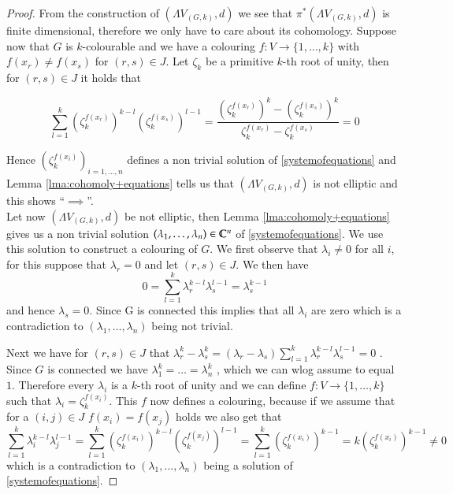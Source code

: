  \begin{proof}
  From the construction of $(\Lambda V_{(G,k)},d)$ we see that  $\pi^*(\Lambda V_{(G,k)},d)$ is finite dimensional, therefore
  we only have to care about its cohomology. Suppose now that $G$ is $k$-colourable and we have a colouring
  $f \colon V \to { \lbrace 1, \dotsc , k \rbrace }$ with $f(x_r) \neq f(x_s)$ for $(r,s) \in J$. Let $\zeta_k$ be a primitive 
  $k$-th root of unity, then for $(r,s) \in J$ it holds that
  
  $$ \sum_{l = 1}^k (\zeta_k^{f(x_r)})^{k-l} (\zeta_k^{f(x_s)})^{l-1}
  = \frac{(\zeta_k^{f(x_r)})^{k} - (\zeta_k^{f(x_s)})^{k}}{ \zeta_k^{f(x_r)} - \zeta_k^{f(x_s)}} = 0
  $$
  
  Hence $(\zeta_k^{f(x_i)})_{i = 1, \dotsc, n}$ defines a non trivial solution of \ref{systemofequations}
  and Lemma \ref{lma:cohomoly+equations} tells us that $(\Lambda V_{(G,k)},d)$ is not elliptic and this shows
  ``$\implies$''. \\
  Let now $(\Lambda V_{(G,k)},d)$ be not elliptic, then Lemma \ref{lma:cohomoly+equations} gives us a non trivial
  solution $(\lambda_1 , \dotsc, \lambda_n) \in \mathbb{C}^n$ of \ref{systemofequations}. We use this solution to construct
  a colouring of $G$. 
  We first observe that $\lambda_i \neq 0$ for all $i$, for this suppose that $\lambda_r = 0$ and let $(r,s) \in J$.
  We then have 
  $$0 =\sum_{l = 1}^k \lambda_r^{k -l} \lambda_s^{l - 1} = \lambda_s^{k-1}$$
  and hence $\lambda_s = 0$. Since G is connected this implies that all $\lambda_i$ are zero which is a
  contradiction to $(\lambda_1, \ldots, \lambda_n)$ being not trivial.
  
  Next we have
  for $(r,s) \in J$ that $ \lambda_r^k - \lambda_s^k = ( \lambda_r - \lambda_s) 
  \sum_{l = 1}^k \lambda_r^{k - l} \lambda_s^{l - 1} = 0$ . Since $G$ is connected we have 
  $\lambda_1^k = \dotsc = \lambda_n^k$ , which we can wlog assume to equal $1$. Therefore every $\lambda_i$ is a 
  $k$-th root of unity and we can define $f \colon V \to { \lbrace 1, \dotsc , k \rbrace }$ such that 
  $\lambda_i = \zeta_k^{f(x_i)}$. This $f$ now defines a colouring, because if we assume that for a $(i,j) \in J$
  $f(x_i) = f(x_j)$ holds we also get that 
  $$\sum_{l = 1}^k \lambda_i^{k - l} \lambda_j^{l - 1} = \sum_{l = 1}^k (\zeta_k^{f(x_i)})^{k-l} (\zeta_k^{f(x_j)})^{l-1}
  = \sum_{l = 1}^k (\zeta_k^{f(x_i)})^{k-1} = k (\zeta_k^{f(x_i)})^{k-1} \neq 0$$ 
  which is a contradiction to $(\lambda_1 , \dotsc, \lambda_n)$ being a solution of \ref{systemofequations}.
  
 \end{proof}

